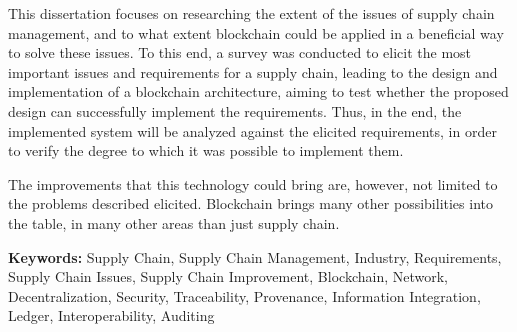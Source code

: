This dissertation focuses on researching the extent of the issues of supply chain management, and to what extent blockchain could be applied in a beneficial way to solve these issues. To this end, a survey was conducted to elicit the most important issues and requirements for a supply chain, leading to the design and implementation of a blockchain architecture, aiming to test whether the proposed design can successfully implement the requirements. Thus, in the end, the implemented system will be analyzed against the elicited requirements, in order to verify the degree to which it was possible to implement them.

The improvements that this technology could bring are, however, not limited to the problems described elicited. Blockchain brings many other possibilities into the table, in many other areas than just supply chain.

\textbf{Keywords:} Supply Chain, Supply Chain Management, Industry, Requirements, Supply Chain Issues, Supply Chain Improvement, Blockchain, Network, Decentralization, Security, Traceability, Provenance, Information Integration, Ledger, Interoperability, Auditing






